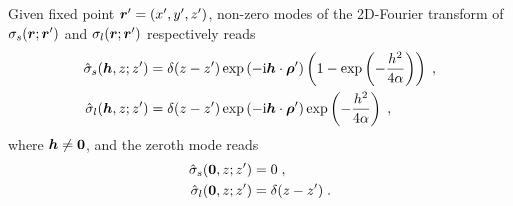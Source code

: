 \begin{prop}
Given fixed point $\boldsymbol{r}^\prime=(x^{\prime}, y^{\prime},z^{\prime})$, non-zero modes of the 2D-Fourier
transform  of  $ \sigma_{s}(\boldsymbol{r};\bm{r}^\prime)$ and   $\sigma_{l}(\boldsymbol{r};\bm{r}^\prime)$  respectively reads
\begin{align*}
 \Hat{\sigma}_{s}(\boldsymbol{h},z;z^\prime) &= \delta(z-z^\prime) \exp{(-\mathrm{i} \boldsymbol{h} \cdot \boldsymbol{\rho}^\prime)}\left(1-\exp\left(-\frac{h^2}{4\alpha}\right)\right)\;,  \\
 \Hat{\sigma}_{l}(\boldsymbol{h},z;z^\prime) &= \delta(z-z^\prime) \exp{(-\mathrm{i} \boldsymbol{h} \cdot \boldsymbol{\rho}^\prime)}\exp\left(-\frac{h^2}{4\alpha}\right)\;,
\end{align*}   
where $\boldsymbol{h}\neq\bm{0}$, and the zeroth mode reads
\begin{align*}
 \Hat{\sigma}_{s}(\bm{0},z;z^\prime) &= 0\;,  \\
 \Hat{\sigma}_{l}(\bm{0},z;z^\prime) &= \delta(z-z^\prime)\;.
\end{align*}   
\end{prop}
